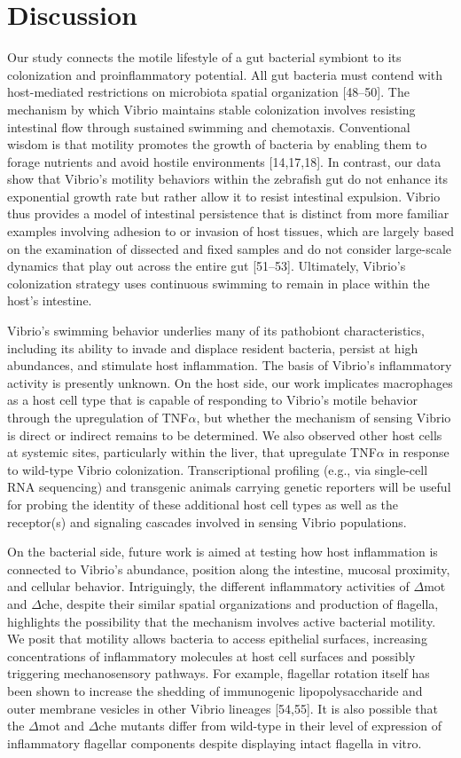 \section{Discussion}
Our study connects the motile lifestyle of a gut bacterial symbiont to its colonization and proinflammatory potential. All gut bacteria must contend with host-mediated restrictions on microbiota spatial organization [48–50]. The mechanism by which Vibrio maintains stable colonization involves resisting intestinal flow through sustained swimming and chemotaxis. Conventional wisdom is that motility promotes the growth of bacteria by enabling them to forage nutrients and avoid hostile environments [14,17,18]. In contrast, our data show that Vibrio's motility behaviors within the zebrafish gut do not enhance its exponential growth rate but rather allow it to resist intestinal expulsion. Vibrio thus provides a model of intestinal persistence that is distinct from more familiar examples involving adhesion to or invasion of host tissues, which are largely based on the examination of dissected and fixed samples and do not consider large-scale dynamics that play out across the entire gut [51–53]. Ultimately, Vibrio's colonization strategy uses continuous swimming to remain in place within the host's intestine.

Vibrio's swimming behavior underlies many of its pathobiont characteristics, including its ability to invade and displace resident bacteria, persist at high abundances, and stimulate host inflammation. The basis of Vibrio's inflammatory activity is presently unknown. On the host side, our work implicates macrophages as a host cell type that is capable of responding to Vibrio's motile behavior through the upregulation of TNF$\alpha$, but whether the mechanism of sensing Vibrio is direct or indirect remains to be determined. We also observed other host cells at systemic sites, particularly within the liver, that upregulate TNF$\alpha$ in response to wild-type Vibrio colonization. Transcriptional profiling (e.g., via single-cell RNA sequencing) and transgenic animals carrying genetic reporters will be useful for probing the identity of these additional host cell types as well as the receptor(s) and signaling cascades involved in sensing Vibrio populations.  

On the bacterial side, future work is aimed at testing how host inflammation is connected to Vibrio's abundance, position along the intestine, mucosal proximity, and cellular behavior. Intriguingly, the different inflammatory activities of $\Delta$mot and $\Delta$che, despite their similar spatial organizations and production of flagella, highlights the possibility that the mechanism involves active bacterial motility. We posit that motility allows bacteria to access epithelial surfaces, increasing concentrations of inflammatory molecules at host cell surfaces and possibly triggering mechanosensory pathways. For example, flagellar rotation itself has been shown to increase the shedding of immunogenic lipopolysaccharide and outer membrane vesicles in other Vibrio lineages [54,55]. It is also possible that the $\Delta$mot and $\Delta$che mutants differ from wild-type in their level of expression of inflammatory flagellar components despite displaying intact flagella in vitro. 

